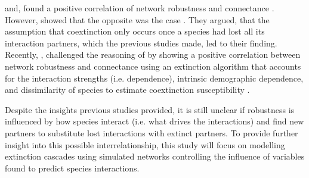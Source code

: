 \documentclass[12pt,a4paper]{article}
\begin{document}

\citeauthor{Dunne2002, Ekloef2006} and, \citeauthor{Thebault2010} found a positive correlation of network robustness and connectance \parencite{Dunne2002, Ekloef2006, Thebault2010}. However, \citeauthor{Vieira2015} showed that the opposite was the case \parencite{Vieira2015}. They argued, that the assumption that coextinction only occurs once a species had lost all its interaction partners, which the previous studies made, led to their finding. Recently, \citeauthor{Baumgartner2020}, challenged the reasoning of \citeauthor{Vieira2015} by showing a positive correlation between network robustness and connectance using an extinction algorithm that accounts for the interaction strengths (i.e. dependence), intrinsic demographic dependence, and dissimilarity of species to estimate coextinction susceptibility \parencite{Baumgartner2020}. 





Despite the insights previous studies provided, it is still unclear if robustness is influenced by how species interact (i.e. what drives the interactions) and find new partners to substitute lost interactions with extinct partners. To provide further insight into this possible interrelationship, this study will focus on modelling extinction cascades using simulated networks controlling the influence of variables found to predict species interactions.\\

\end{document}
